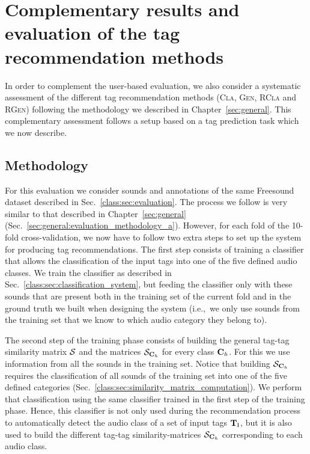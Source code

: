 \section[Complementary results and evaluation of the tag recommendation methods][Comp. res. and eval. of the tag rec. methods]{Complementary results and evaluation of the tag recommendation methods}
\label{class:sec:pb_evaluation}

In order to complement the user-based evaluation, we also consider a systematic assessment of the different tag recommendation methods (\textsc{Cla}, \textsc{Gen}, \textsc{RCla} and \textsc{RGen}) following the methodology we described in Chapter~\ref{sec:general}. This complementary assessment follows a setup based on a tag prediction task which we now describe.

\subsection{Methodology}

For this evaluation we consider sounds and annotations of the same Freesound dataset described in Sec.~\ref{class:sec:evaluation}. 
The process we follow is very similar to that described in Chapter~\ref{sec:general} (Sec.~\ref{sec:general:evaluation_methodology_a}).
However, for each fold of the 10-fold cross-validation, we now have to follow two extra steps to set up the system for producing tag recommendations.
The first step consists of training a classifier that allows the classification of the input tags into one of the five defined audio classes. We train the classifier as described in Sec.~\ref{class:sec:classification_system}, but feeding the classifier only with these sounds that are present both in the training set of the current fold and in the ground truth we built when designing the system (i.e.,~we only use sounds from the training set that we know to which audio category they belong to).

The second step of the training phase consists of building the general tag-tag similarity matrix $\mathcal{S}$ and the matrices $\mathcal{S}_{\mathbf{C}_{h}}$ for every class $\mathbf{C}_{h}$. For this we use information from all the sounds in the training set. Notice that building $\mathcal{S}_{\mathbf{C}_{h}}$ requires the classification of all sounds of the training set into one of the five defined categories (Sec.~\ref{class:sec:similarity_matrix_computation}). We perform that classification using the same classifier trained in the first step of the training phase. Hence, this classifier is not only used during the recommendation process to automatically detect the audio class of a set of input tags $\mathbf{T}_{\text{I}}$, but it is also used to build the different tag-tag similarity-matrices $\mathcal{S}_{\mathbf{C}_{h}}$ corresponding to each audio class.

